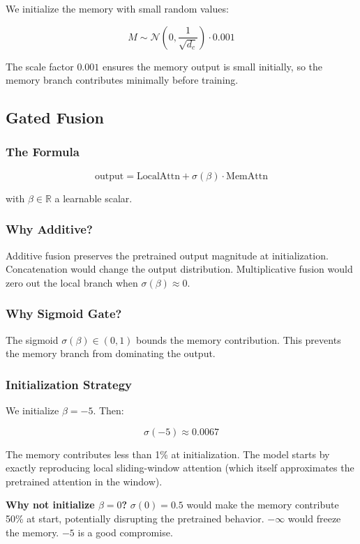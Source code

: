 We initialize the memory with small random values:

\[
M \sim \mathcal{N}\!\left(0, \frac{1}{\sqrt{d_c}}\right) \cdot 0.001
\tag{4.6}
\]

The scale factor $0.001$ ensures the memory output is small initially, 
so the memory branch contributes minimally before training.

\subsection{Gated Fusion}

\subsubsection{The Formula}

\[
\text{output} = \text{LocalAttn} + \sigma(\beta) \cdot \text{MemAttn}
\tag{4.7}
\]

with $\beta \in \mathbb{R}$ a learnable scalar.

\subsubsection{Why Additive?}

Additive fusion preserves the pretrained output magnitude at initialization. 
Concatenation would change the output distribution. Multiplicative fusion 
would zero out the local branch when $\sigma(\beta) \approx 0$.

\subsubsection{Why Sigmoid Gate?}

The sigmoid $\sigma(\beta) \in (0, 1)$ bounds the memory contribution. This 
prevents the memory branch from dominating the output.

\subsubsection{Initialization Strategy}

We initialize $\beta = -5$. Then:

\[
\sigma(-5) \approx 0.0067
\tag{4.8}
\]

The memory contributes less than 1\% at initialization. The model starts 
by exactly reproducing local sliding-window attention (which itself 
approximates the pretrained attention in the window).

\textbf{Why not initialize $\beta = 0$?} $\sigma(0) = 0.5$ would make the memory 
contribute 50\% at start, potentially disrupting the pretrained behavior. 
$-\infty$ would freeze the memory. $-5$ is a good compromise.

